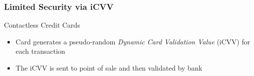 \documentclass[unknownkeysallowed]{beamer}
\begin{document}
\begin{frame}
\frametitle{Limited Security via iCVV}
  \begin{center}
  \begin{minipage}{.9\textwidth}
  \begin{block}{Contactless Credit Cards}
    \begin{itemize}
      \item{Card generates a pseudo-random \textit{Dynamic Card Validation Value} (iCVV) for each transaction}
      \pause
      \item{The iCVV is sent to point of sale and then validated by bank}
    \end{itemize}
  \end{block}
  \end{minipage}
  \end{center}
\end{frame}
\end{document}
